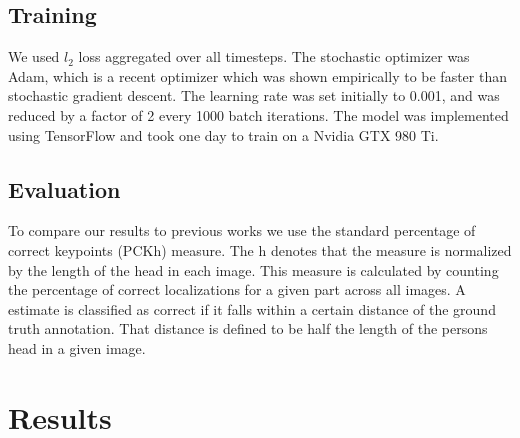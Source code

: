 \documentclass[11pt,twocolumn,letterpaper]{article}
\begin{document}

\subsection{Training}

We used $l_2$ loss aggregated over all timesteps. 
The stochastic optimizer was Adam, which is a recent optimizer which was shown empirically
to be 
faster than stochastic gradient descent. The learning
rate was set initially to 0.001, and was reduced by a factor of 2 every 1000 batch iterations.
The model was implemented using TensorFlow and took one day to train on a Nvidia GTX 980 Ti.

\subsection{Evaluation}


To compare our results to previous works we use the standard percentage of correct keypoints (PCKh) measure. The h denotes that the measure is normalized by the length of the head in each image. This measure is calculated by counting the percentage of correct localizations for a given part across all images. A estimate is classified as correct if it falls within a certain distance of the ground truth annotation. That distance is defined to be half the length of the persons head in a given image.

\section{Results}
\end{document}
